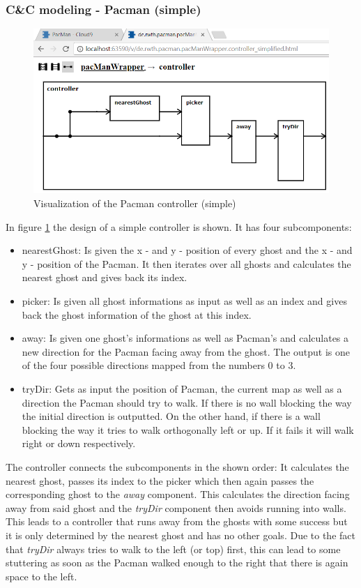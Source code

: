 \subsubsection{C\&C modeling - Pacman (simple)}
\begin{figure}
	\caption{Visualization of the Pacman controller (simple)}
	\label{fig:visPacmanSimple}
	\centering
	\includegraphics[scale=0.7]{pictures/VisualizationPacmanSimple.png}
\end{figure}
In figure \ref{fig:visPacmanSimple} the design of a simple controller is shown. It has four subcomponents:
\begin{itemize}
	\item nearestGhost: Is given the x - and y - position of every ghost and the x - and y - position of the Pacman. It then iterates over all ghosts and calculates the nearest ghost and gives back its index.
	\item picker: Is given all ghost informations as input as well as an index and gives back the ghost information of the ghost at this index.
	\item away: Is given one ghost's informations as well as Pacman's and calculates a new direction for the Pacman facing away from the ghost. The output is one of the four possible directions mapped from the numbers 0 to 3.
	\item tryDir: Gets as input the position of Pacman, the current map as well as a direction the Pacman should try to walk. If there is no wall blocking the way the initial direction is outputted. On the other hand, if there is a wall blocking the way it tries to walk orthogonally left or up. If it fails it will walk right or down respectively.
\end{itemize}
The controller connects the subcomponents in the shown order: It calculates the nearest ghost, passes its index to the picker which then again passes the corresponding ghost to the \textit{away} component. This calculates the direction facing away from said ghost and the \textit{tryDir} component then avoids running into walls. This leads to a controller that runs away from the ghosts with some success but it is only determined by the nearest ghost and has no other goals. Due to the fact that \textit{tryDir} always tries to walk to the left (or top) first, this can lead to some stuttering as soon as the Pacman walked enough to the right that there is again space to the left. \newline
